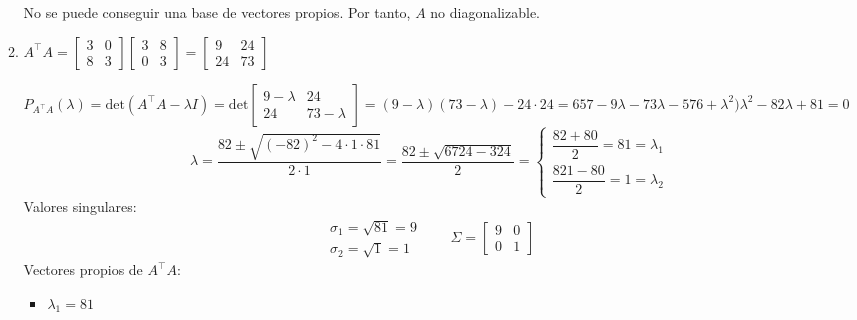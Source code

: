 \begin{enumerate}[label=\color{red}\textbf{\arabic*)}]
\begin{enumerate}[label=\color{red}\textbf{\alph*)}]
        No se puede conseguir una base de vectores propios. Por tanto, $A$ no diagonalizable.
    \item {}

    $A^\intercal A=\begin{bmatrix} 
        3 & 0\\
        8 & 3
    \end{bmatrix}\begin{bmatrix} 
        3 & 8\\
        0 & 3
    \end{bmatrix}=\begin{bmatrix} 
        9 & 24\\
        24 & 73
    \end{bmatrix}$ 

    $P_{A^\intercal A}(\lambda)=\mathrm{det}(A^\intercal A-\lambda I)=\mathrm{det}\begin{bmatrix} 
        9-\lambda & 24\\
        24 & 73-\lambda
    \end{bmatrix}=(9-\lambda)(73-\lambda)-24\cdot 24=657-9\lambda-73\lambda-576+\lambda^2)\lambda^2-82\lambda+81=0$
    \[
    \lambda=\dfrac{82\pm\sqrt{(-82)^2-4\cdot 1\cdot 81} }{2\cdot 1}=\dfrac{82\pm\sqrt{6724-324} }{2}=\begin{cases}
        \dfrac{82+80}{2}=81=\lambda_1\\
        \dfrac{821-80}{2}=1=\lambda_2
    \end{cases}
    \] 
    Valores singulares: \[
    \begin{array}{l}
        \sigma_1=\sqrt{81}=9\\
        \sigma_2=\sqrt{1}=1 
    \end{array}\qquad\Sigma=\begin{bmatrix} 
    9 & 0\\0 & 1 
    \end{bmatrix} 
    \] 
    Vectores propios de $A^\intercal A$:
    \begin{itemize}[label=\textbullet]
        \item $\lambda_1=81$


\end{itemize}
\end{enumerate}
\end{enumerate}
